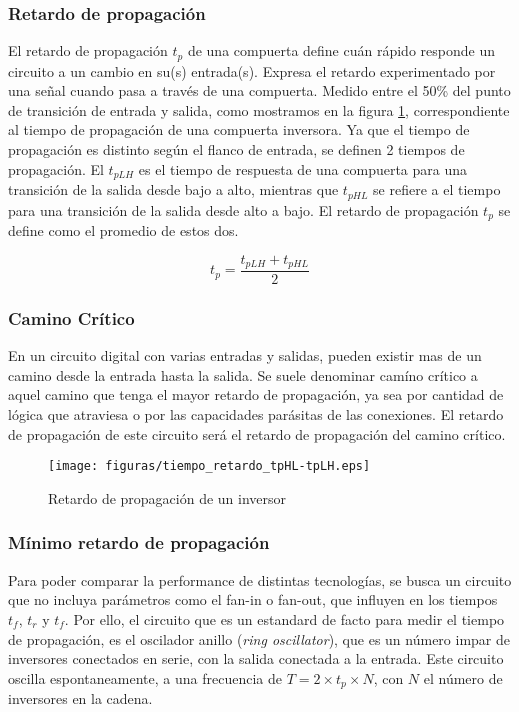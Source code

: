 \subsubsection{Retardo de propagación}
El retardo de propagación $t_p$ de una compuerta define cuán rápido responde un circuito a un cambio en su(s) entrada(s). Expresa el retardo experimentado por una señal cuando pasa a través de una compuerta. Medido entre el 50\% del punto de transición de entrada y salida, como mostramos en la figura \ref{fig:propagationDelay}, correspondiente al tiempo de propagación de una compuerta inversora. Ya que el tiempo de propagación es distinto según el flanco de entrada, se definen 2 tiempos de propagación. El $t_{pLH}$ es el tiempo de respuesta de una compuerta  para una transición de la salida desde bajo a alto, mientras que $t_{pHL}$ se refiere a el tiempo para una transición de la salida desde alto a bajo. El retardo de propagación $t_p$ se define como el promedio de estos dos.

$$ t_p = \frac{t_{pLH} + t_{pHL}}{2} $$

\subsubsection{Camino Crítico}
En un circuito digital con varias entradas y salidas, pueden existir mas de un camino desde la entrada hasta la salida. Se suele denominar camíno crítico a aquel camino que tenga el mayor retardo de propagación, ya sea por cantidad de lógica que atraviesa o por las capacidades parásitas de las conexiones. El retardo de propagación de este circuito será el retardo de propagación del camino crítico.


\begin{figure}[h]
\centering
\texttt{[image: figuras/tiempo\_retardo\_tpHL-tpLH.eps]}
  \caption{Retardo de propagación de un inversor}
  \label{fig:propagationDelay}
\end{figure}



\subsubsection{Mínimo retardo de propagación}

Para poder comparar la performance de distintas tecnologías, se busca un circuito que no incluya parámetros como el fan-in o fan-out, que influyen en los tiempos $t_f$, $t_r$ y $t_f$. Por ello, el circuito que es un estandard de facto para medir el tiempo de propagación, es el oscilador anillo (\emph{ring oscillator}), que es un número impar de inversores conectados en serie, con la salida conectada a la entrada. Este circuito oscilla espontaneamente, a una frecuencia de $T = 2 \times t_p \times N$, con $N$ el número de inversores en la cadena. 

